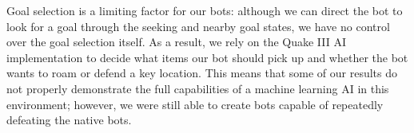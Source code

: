 Goal selection is a limiting factor for our bots: although we can direct the bot to look for a goal through the seeking and nearby goal states, we have no control over the goal selection itself. As a result, we rely on the Quake III AI implementation to decide what items our bot should pick up and whether the bot wants to roam or defend a key location. This means that some of our results do not properly demonstrate the full capabilities of a machine learning AI in this environment; however, we were still able to create bots capable of repeatedly defeating the native bots.